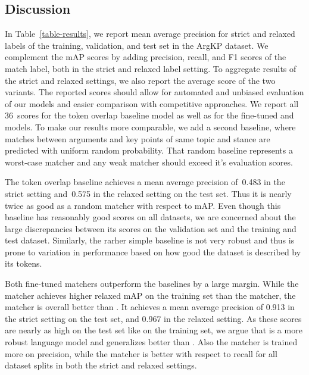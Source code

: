 \subsection{Discussion}

In Table~\ref{table-results}, we report mean average precision for strict and relaxed labels of the training, validation, and test set in the ArgKP dataset.
We complement the mAP scores by adding precision, recall, and F1 scores of the match label, both in the strict and relaxed label setting.
To aggregate results of the strict and relaxed settings, we also report the average score of the two variants.
The reported scores should allow for automated and unbiased evaluation of our models and easier comparison with competitive approaches.
We report all 36~scores for the token overlap baseline model as well as for the fine-tuned \BertBase and \RobertaBase models.
To make our results more comparable, we add a second baseline, where matches between arguments and key points of same topic and stance are predicted with uniform random probability.
That random baseline represents a worst-case matcher and any weak matcher should exceed it's evaluation scores.

The token overlap baseline achieves a mean average precision of~0.483 in the strict setting and~0.575 in the relaxed setting on the test set.
Thus it is nearly twice as good as a random matcher with respect to mAP.
Even though this baseline has reasonably good scores on all datasets, we are concerned about the large discrepancies between its scores on the validation set and the training and test dataset.
Similarly, the rarher simple baseline is not very robust and thus is prone to variation in performance based on how good the dataset is described by its tokens.

Both fine-tuned matchers outperform the baselines by a large margin.
While the \BertBase matcher achieves higher relaxed mAP on the training set than the \RobertaBase matcher, the \RobertaBase matcher is overall better than \Bert.
It achieves a mean average precision of 0.913 in the strict setting on the test set, and 0.967 in the relaxed setting.
As these scores are nearly as high on the test set like on the training set, we argue that \Roberta is a more robust language model and generalizes better than \Bert.
Also the \RobertaBase matcher is trained more on precision, while the \BertBase matcher is better with respect to recall for all dataset splits in both the strict and relaxed settings.


